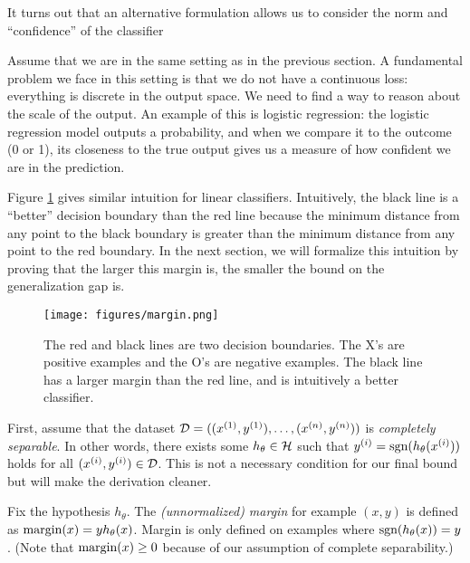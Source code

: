 It turns out that an alternative formulation allows us to consider the norm and ``confidence'' of the classifier

Assume that we are in the same setting as in the previous section. A fundamental problem we face in this setting is that we do not have a continuous loss: everything is discrete in the output space. We need to find a way to reason about the scale of the output. An example of this is logistic regression: the logistic regression model outputs a probability, and when we compare it to the outcome (0 or 1), its closeness to the true output gives us a measure of how confident we are in the prediction.

Figure \ref{lec6:fig:margin} gives similar intuition for linear classifiers. Intuitively, the black line is a ``better'' decision boundary than the red line because the minimum distance from any point to the black boundary is greater than the minimum distance from any point to the red boundary. In the next section, we will formalize this intuition by proving that the larger this margin is, the smaller the bound on the generalization gap is.

\begin{figure}[ht!]
    \begin{center}
  \texttt{[image: figures/margin.png]}
  \end{center}
  \caption{The red and black lines are two decision boundaries. The X's are positive examples and the O's are negative examples. The black line has a larger margin than the red line, and is intuitively a better classifier.}
  \label{lec6:fig:margin}
\end{figure}

 \label{sec:formal_margin}
First, assume that the dataset $\mathcal D = ((x^{(1)}, y^{(1)}), \dots, (x^{(n)}, y^{(n)}))$ is \textit{completely separable}. In other words, there exists some $h_\theta\in\mathcal H$ such that $y^{(i)} = \text{sgn}(h_\theta(x^{(i)}))$ holds for all $( x^{(i)},y^{(i)})\in \mathcal D$. This is not a necessary condition for our final bound but will make the derivation cleaner.

\begin{definition}
Fix the hypothesis $h_\theta$. The \textit{(unnormalized) margin} for example $(x, y)$ is defined as $\text{margin}(x) = yh_\theta(x)$. Margin is only defined on examples where $\text{sgn}(h_\theta(x)) = y$. (Note that $\text{margin}(x)\geq 0$ because of our assumption of complete separability.)
\end{definition}


